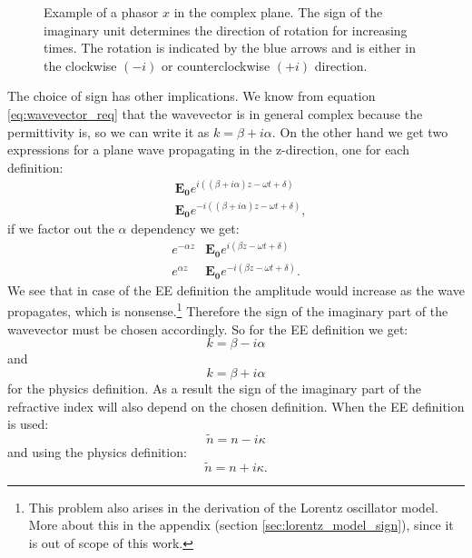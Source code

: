 \begin{figure}[h]
    \centering
    
    \caption{Example of a phasor $x$ in the complex plane. The sign of the imaginary unit determines the direction of rotation for increasing times. The rotation is indicated by the blue arrows and is either in the clockwise $(-i)$ or counterclockwise $(+i)$ direction.}
    \label{fig:phasor}
\end{figure}

The choice of sign has other implications. We know from equation \ref{eq:wavevector_req} that the wavevector is in general complex because the permittivity is, so we can write it as $k=\beta + i \alpha$. On the other hand we get two expressions for a plane wave propagating in the z-direction, one for each definition:
\begin{align}
    &\bm{E_{0}}e^{i((\beta + i \alpha)z-\omega t + \delta)} \\
    &\bm{E_{0}}e^{-i((\beta + i \alpha)z-\omega t + \delta)}, 
\end{align}
if we factor out the $\alpha$ dependency we get:
\begin{align}
    e^{-\alpha z}&\bm{E_{0}}e^{i(\beta z-\omega t + \delta)} \\
    e^{\alpha z}&\bm{E_{0}}e^{-i(\beta z-\omega t + \delta)}. 
\end{align}
We see that in case of the EE definition the amplitude would increase as the wave propagates, which is nonsense.\footnote{This problem also arises in the derivation of the Lorentz oscillator model. More about this in the appendix (section \ref{sec:lorentz_model_sign}), since it is out of scope of this work.} Therefore the sign of the imaginary part of the wavevector must be chosen accordingly. So for the EE definition we get:
\begin{equation}
    k=\beta - i \alpha
\end{equation}
and 
\begin{equation}
    k=\beta + i \alpha
\end{equation}
for the physics definition.
As a result the sign of the imaginary part of the refractive index will also depend on the chosen definition. When the EE definition is used:
\begin{equation}
    \tilde{n}= n - i \kappa
\end{equation}
and using the physics definition:  
\begin{equation}
    \tilde{n}= n + i \kappa.
\end{equation}

